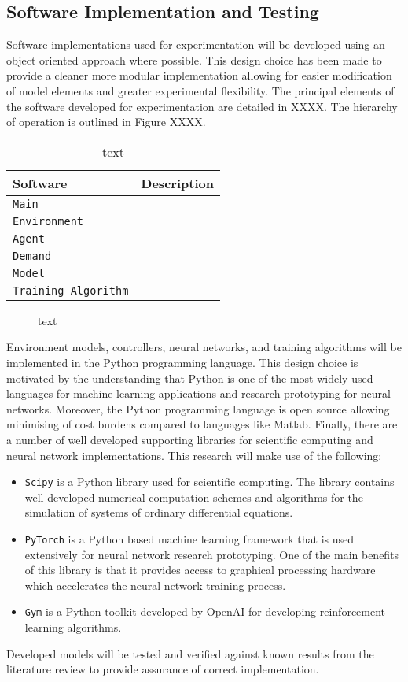 \subsection{Software Implementation and Testing}
Software implementations used for experimentation will be developed using an object oriented approach where possible. This design choice has been made to provide a cleaner more modular implementation allowing for easier modification of model elements and greater experimental flexibility. The principal elements of the software developed for experimentation are detailed in XXXX. The hierarchy of operation is outlined in Figure XXXX.
\begin{table}[h]
	\centering
	\caption{text}
	\begin{tabular}{ll}
		\toprule
		\textbf{Software} & \textbf{Description} \\
		\midrule
		\texttt{Main} & \\
		\texttt{Environment} & \\
		\texttt{Agent} & \\
		\texttt{Demand} & \\
		\texttt{Model} & \\
		\texttt{Training Algorithm} & \\
		\bottomrule
	\end{tabular}
\end{table}

\begin{figure}[h]
	
	\caption{text}
\end{figure}

Environment models, controllers, neural networks, and training algorithms will be implemented in the Python programming language. This design choice is motivated by the understanding that Python is one of the most widely used languages for machine learning applications and research prototyping for neural networks. Moreover, the Python programming language is open source allowing minimising of cost burdens compared to languages like Matlab. Finally, there are a number of well developed supporting libraries for scientific computing and neural network implementations. This research will make use of the following:
\begin{itemize}
	\item \texttt{Scipy} is a Python library used for scientific computing. The library contains well developed numerical computation schemes and algorithms for the simulation of systems of ordinary differential equations.
	\item \texttt{PyTorch} is a Python based machine learning framework that is used extensively for neural network research prototyping. One of the main benefits of this library is that it provides access to graphical processing hardware which accelerates the neural network training process.
	\item \texttt{Gym} is a Python toolkit developed by OpenAI for developing reinforcement learning algorithms.
\end{itemize}

Developed models will be tested and verified against known results from the literature review to provide assurance of correct implementation.
